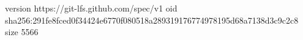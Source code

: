 version https://git-lfs.github.com/spec/v1
oid sha256:291fe8fced0f34424e6770f080518a289319176774978195d68a7138d3c9c2c8
size 5566
